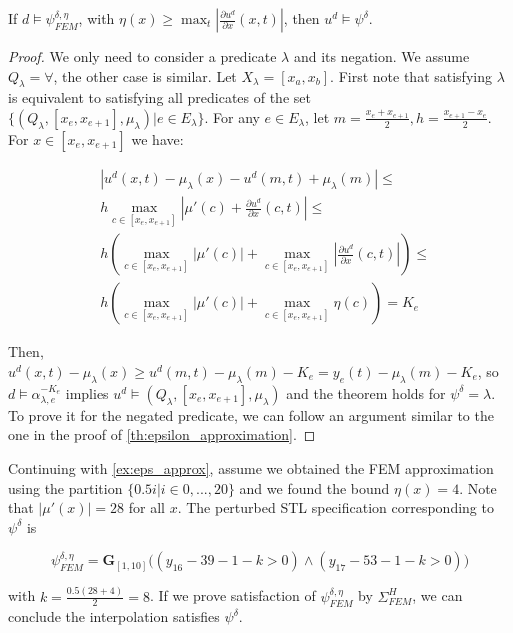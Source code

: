 \documentclass[oribibl]{llncs/llncs}
\newcommand{\Always}{\mathbf{G}}
\begin{document}
\begin{theorem}
\label{th:eta_approximation}
    If $d \models \psi^{\delta, \eta}_{FEM}$, with $\eta(x) \geq \max_t |\frac{\partial
    u^d}{\partial x}(x, t)|$, then $u^d \models \psi^\delta$.
\end{theorem}
\begin{proof}
    We only need to consider a predicate $\lambda$ and its negation. We assume
    $Q_\lambda = \forall$, the other case is similar. Let $X_\lambda = [x_a,
    x_b]$. First note that satisfying $\lambda$ is equivalent to satisfying all
    predicates of the set $\{(Q_\lambda, [x_e, x_{e+1}], \mu_\lambda) | e \in
    E_\lambda\}$. For any $e \in E_\lambda$, let $m = \frac{x_e + x_{e+1}}{2}, 
    h = \frac{x_{e+1} - x_{e}}{2}$. 
    For $x \in [x_e, x_{e+1}]$ we have:

    \begin{equation}
    \begin{aligned}
        &|u^d(x, t) - \mu_\lambda(x) - u^d(m, t) + \mu_\lambda(m)| \leq \\
        &h \max_{c \in [x_e, x_{e+1}]} 
        |\mu'(c) + \frac{\partial u^d}{\partial x}(c, t)|
        \leq \\
        &h \left (  
        \max_{c \in [x_e, x_{e+1}]} |\mu'(c)| +
        \max_{c \in [x_e, x_{e+1}]} |\frac{\partial u^d}{\partial x}(c, t)|
        \right ) \leq \\
        &h \left (  
        \max_{c \in [x_e, x_{e+1}]} |\mu'(c)| +
        \max_{c \in [x_e, x_{e+1}]} \eta(c)
        \right )  = K_e
    \end{aligned}
    \end{equation}

    Then, $u^d(x, t) - \mu_\lambda(x) \geq u^d(m, t) - \mu_\lambda(m) - K_e =
    y_e(t) - \mu_\lambda(m) - K_e$, so $d \models \alpha^{-K_e}_{\lambda, e}$
    implies $u^d \models (Q_\lambda, [x_e, x_{e+1}], \mu_\lambda)$ and the
    theorem holds for $\psi^\delta = \lambda$. To prove it for the negated
    predicate, we can follow an argument similar to the one in the proof of
    \cref{th:epsilon_approximation}.
\end{proof}

\begin{example}
    \label{ex:eta_approx}

    Continuing with \cref{ex:eps_approx}, assume we obtained the FEM
    approximation using the partition $\{0.5 i | i \in 0,...,20\}$ and we found the
    bound $\eta(x) = 4$. Note that $|\mu'(x)| = 28$ for all $x$. The perturbed STL
    specification corresponding to $\psi^\delta$ is

    \begin{equation}
        \psi^{\delta, \eta}_{FEM} = \Always_{[1,10]} \bigl(
            (y_{16} - 39 - 1 - k > 0) \land (y_{17} - 53 - 1 - k > 0)
        \bigr)
    \end{equation}

    with $k = \frac{0.5 (28 + 4)}{2} = 8$. If we prove satisfaction of $\psi^{\delta,
    \eta}_{FEM}$ by $\Sigma^H_{FEM}$, we can conclude the interpolation satisfies
    $\psi^\delta$.
    
\end{example}
\end{document}
